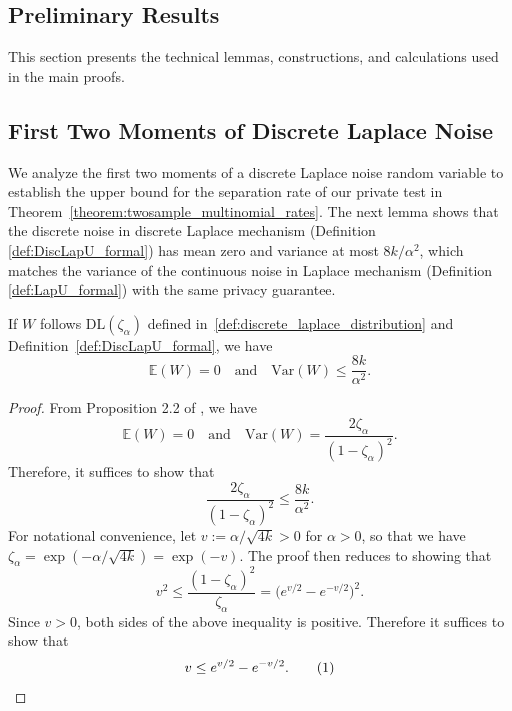 \documentclass[twoside,11pt]{article}
\newcommand\numberthis{\addtocounter{equation}{1}\tag{\theequation}}
\newcommand{\alphabetSize}{k} %
\newcommand{\privacyParameter}{\alpha} %
\newcommand{\distparamDiscLap}{\zeta}%
\newcommand{\discLapUParam}{\distparamDiscLap_{\privacyParameter}}
\begin{document}
\begin{appendix}
	
	\section{Preliminary Results}\label{section:appendix_prelim}
	This section presents the technical lemmas, constructions, and calculations used in the main proofs.
	\subsection{First Two Moments of Discrete Laplace Noise}\label{proof:discLapUVar}
	We analyze the first two moments of a discrete Laplace noise random variable to establish the upper bound for the separation rate of our private test in Theorem~\ref{theorem:twosample_multinomial_rates}. The next lemma shows that the discrete noise in discrete Laplace mechanism (Definition \ref{def:DiscLapU_formal}) has mean zero and variance at most $8\alphabetSize/\privacyParameter^2$, which matches the variance of the continuous noise in Laplace mechanism (Definition \ref{def:LapU_formal}) with the same privacy guarantee.
	\begin{lemma}\label{lemma:discLapU_Variance}
		If $W$ follows $ \mathrm{DL}(\discLapUParam)$ defined in~\eqref{def:discrete_laplace_distribution} and Definition~\ref{def:DiscLapU_formal}, we have
		$$
		\mathbb{E}(W) = 0\quad \text{and} \quad\mathrm{Var}(W) \leq \frac{8\alphabetSize}{\privacyParameter^2}.
		$$
		\begin{proof}
			From Proposition 2.2 of \citet{inusah_discrete_2006}, we have
			$$\mathbb{E}(W) = 0
			\quad \text{and} \quad
			\mathrm{Var}(W) = \frac{2\discLapUParam}{(1-\discLapUParam)^2}.$$
			Therefore, it suffices to show that
			$$ \frac{2\discLapUParam}{(1-\discLapUParam)^2} \leq \frac{8\alphabetSize}{\privacyParameter^2}.$$
			For notational convenience, let $v :=  \privacyParameter/\sqrt{4\alphabetSize}>0$ for $\privacyParameter>0$, so that we have $
			\discLapUParam
			=
			\exp({
				-
				\privacyParameter/\sqrt{4\alphabetSize}
			})
			=
			\exp({-v}).$
			The proof then reduces to showing that
			$$
			v^2
			\leq
			\frac{(1 - \discLapUParam)^2}{\discLapUParam} = 
			\bigl(
			e^{v/2} - e^{-v/2}
			\bigr)^2.
			$$
			Since $v>0$, both sides of the above inequality is positive. Therefore it suffices to show that
			\begin{align*}
				v \leq 
				e^{v/2} - e^{-v/2}.
				\numberthis \label{eq:cond_for_disc_var}
			\end{align*}

\end{proof}
\end{lemma}
\end{appendix}
\end{document}
